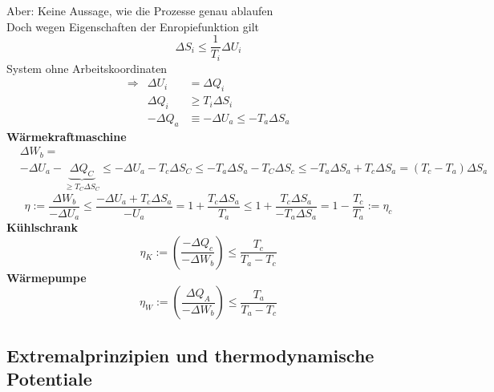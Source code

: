 \documentclass[10pt]{scrartcl}
\begin{document}
\begin{fleqn}
Aber: Keine Aussage, wie die Prozesse genau ablaufen\\
Doch wegen Eigenschaften der Enropiefunktion gilt
\begin{equation}
\Delta S_i \leq \frac{1}{T_i}\Delta U_i
\end{equation}
System ohne Arbeitskoordinaten 
\begin{eqnarray}
\Rightarrow &\Delta U_i &= \Delta Q_i\\
&\Delta Q_i &\geq T_i\Delta S_i\\
&-\Delta Q_a &\equiv -\Delta U_a \leq-T_a\Delta S_a
\end{eqnarray}
\textbf{Wärmekraftmaschine}
\begin{equation}
\begin{aligned}
&\Delta W_b=\\
&-\Delta U_a- \underbrace{\Delta Q_C}_{\geq T_C \Delta S_C}\leq -\Delta U_a-T_c\Delta S_C\leq -T_a\Delta S_a-T_C\Delta S_c\leq -T_a\Delta S_a+T_c\Delta S_a=(T_c-T_a)\Delta S_a
\end{aligned}
\end{equation}
\begin{equation}
\eta := \frac{\Delta W_b}{-\Delta U_a}\leq\frac{-\Delta U_a +T_c\Delta S_a}{- U_a}=1+\frac{T_c\Delta S_a}{T_a}\leq 1+\frac{T_c\Delta S_a}{-T_a\Delta S_a}= 1-\frac{T_c}{T_a}:=\eta_c
\label{eq:carnot}
\end{equation}
\textbf{Kühlschrank}\\
\begin{equation}
\eta_K:=\left(\frac{-\Delta Q_c}{-\Delta W_b}\right)\leq\frac{T_c}{T_a-T_c}
\end{equation}
\textbf{Wärmepumpe}\\
\begin{equation}
\eta_W:=\left(\frac{\Delta Q_A}{-\Delta W_b}\right)\leq\frac{T_a}{T_a-T_c}
\end{equation}

\subsection{Extremalprinzipien und thermodynamische Potentiale}

\end{fleqn}
\end{document}
